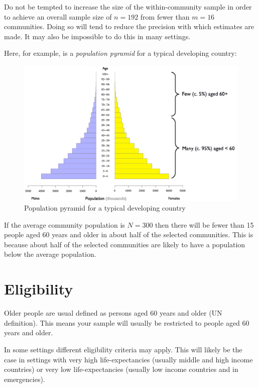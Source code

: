 \documentclass[12pt,a4paper]{book}
\theoremstyle{definition}
\theoremstyle{definition}
\theoremstyle{definition}
\theoremstyle{remark}
\begin{document}
Do not be tempted to increase the size of the within-community sample in
order to achieve an overall sample size of \(n = 192\) from fewer than
\(m = 16\) communities. Doing so will tend to reduce the precision with
which estimates are made. It may also be impossible to do this in many
settings.

Here, for example, is a \emph{population pyramid} for a typical
developing country:

\begin{figure}[H]

{\centering \includegraphics[width=800pt]{figures/popPyramid1} 

}

\caption{Population pyramid for a typical developing country}\label{fig:sample2}
\end{figure}

If the average community population is \(N = 300\) then there will be
fewer than 15 people aged 60 years and older in about half of the
selected communities. This is because about half of the selected
communities are likely to have a population below the average
population.

\hypertarget{eligibility}{%
\section{Eligibility}\label{eligibility}}

Older people are usual defined as persons aged 60 years and older (UN
definition). This means your sample will usually be restricted to people
aged 60 years and older.

In some settings different eligibility criteria may apply. This will
likely be the case in settings with very high life-expectancies (usually
middle and high income countries) or very low life-expectancies (usually
low income countries and in emergencies).
\end{document}

